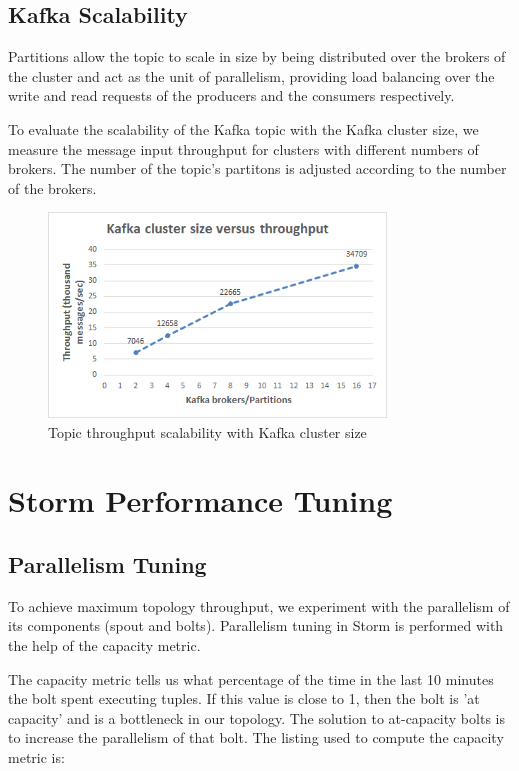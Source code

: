 \subsection{Kafka Scalability}

Partitions allow the topic to scale in size by being distributed over the brokers of the cluster and act as the unit of parallelism, providing load balancing over the write and read requests of the producers and the consumers respectively.

To evaluate the scalability of the Kafka topic with the Kafka cluster size, we measure the message input throughput for clusters with different numbers of brokers. The number of the topic's partitons is adjusted according to the number of the brokers.

\begin{figure}[H]
\centering
\includegraphics[width=0.8\textwidth]{figures/benchmarks_kafka_scalability}
\caption{Topic throughput scalability with Kafka cluster size}
\label{figure:benchmarks_kafka_scalability}
\end{figure}


\section{Storm Performance Tuning}

\subsection{Parallelism Tuning}\label{subsection:benchmarks_storm_tuning}

To achieve maximum topology throughput, we experiment with the parallelism of its components (spout and bolts). Parallelism tuning in Storm is performed with the help of the capacity metric. 

The capacity metric tells us what percentage of the time in the last 10 minutes the bolt spent executing tuples. If this value is close to 1, then the bolt is 'at capacity' and is a bottleneck in our topology. The solution to at-capacity bolts is to increase the parallelism of that bolt. The listing used to compute the capacity metric is:

